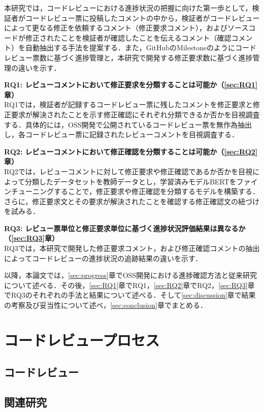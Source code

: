 \documentclass[11pt]{jreport}
\newcommand{\RQOne}{レビューコメントにおいて修正要求を分類することは可能か}
\newcommand{\RQTwo}{レビューコメントにおいて修正確認を分類することは可能か}
\newcommand{\RQThree}{レビュー票単位と修正要求単位に基づく進捗状況評価結果は異なるか}
\begin{document}
本研究では，コードレビューにおける進捗状況の把握に向けた第一歩として，検証者がコードレビュー票に投稿したコメントの中から，検証者がコードレビューによって更なる修正を依頼するコメント（修正要求コメント），およびソースコードが修正されたことを検証者が確認したことを伝えるコメント（確認コメント）を自動抽出する手法を提案する．また，GitHubのMilestoneのようにコードレビュー票数に基づく進捗管理と，本研究で開発する修正要求数に基づく進捗管理の違いを示す．

\noindent\textbf{RQ1: \RQOne（\ref{sec:RQ1}章）}\\
RQ1では，検証者が記録するコードレビュー票に残したコメントを修正要求と修正要求が解決されたことを示す修正確認にそれぞれ分類できるか否かを目視調査する．具体的には，OSS開発で公開されているコードレビュー票を無作為抽出し，各コードレビュー票に記録されたレビューコメントを目視調査する．

\noindent\textbf{RQ2: \RQTwo（\ref{sec:RQ2}章）}\\
RQ2では，レビューコメントに対して修正要求や修正確認であるか否かを目視によって分類したデータセットを教師データとし，学習済みモデルBERTをファインチューニングすることで，修正要求や修正確認を分類するモデルを構築する．さらに，修正要求文とその要求が解決されたことを確認する修正確認文の紐づけを試みる．

\noindent\textbf{RQ3: \RQThree（\ref{sec:RQ3}章）}\\
RQ3では，本研究で開発した修正要求コメント，および修正確認コメントの抽出によってコードレビューの進捗状況の追跡結果の違いを示す．

以降，本論文では，\ref{sec:progress}章でOSS開発における進捗確認方法と従来研究について述べる．その後，\ref{sec:RQ1}章でRQ1，\ref{sec:RQ2}章でRQ2，\ref{sec:RQ3}章でRQ3のそれぞれの手法と結果について述べる．そして\ref{sec:discussion}章で結果の考察及び妥当性について述べ，\ref{sec:conclusion}章でまとめる．

\chapter{コードレビュープロセス}

\section{コードレビュー}
\section{関連研究}
\end{document}

